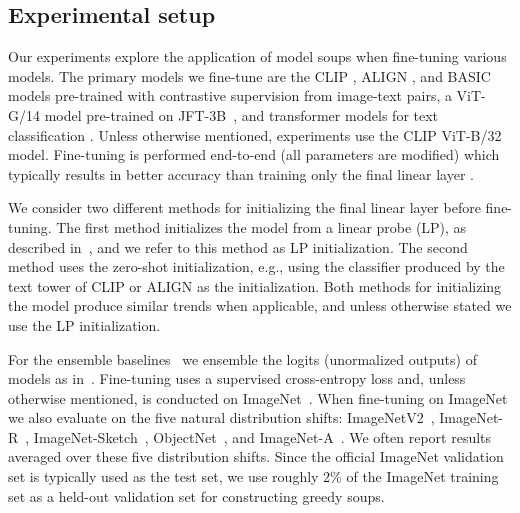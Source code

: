 \documentclass[nohyperref]{article}
\theoremstyle{plain}
\theoremstyle{definition}
\theoremstyle{remark}
\begin{document}
        \subsection{Experimental setup}\label{sec:setup}
        
        Our experiments explore the application of model soups when fine-tuning various models.
        The primary models we fine-tune are
        the CLIP \cite{radford2021learning}, ALIGN \cite{jia2021scaling}, and BASIC~\cite{pham2021scaling} 
        models pre-trained with contrastive supervision from image-text pairs,
        a ViT-G/14 model pre-trained on JFT-3B~\cite{zhai2021scaling},
        and transformer models for text classification \cite{devlin-etal-2019-bert,colin2020exploring}.
        Unless otherwise mentioned, experiments use the CLIP ViT-B/32 model.
        Fine-tuning is performed end-to-end (all parameters are modified)
        which typically results
        in better accuracy than training only the final linear layer \cite{kornblith2019better,agrawal2014analyzing,chatfield2014return,azizpour2015generic}.
        
        We consider two different methods for initializing the final linear layer before fine-tuning.
        The first method initializes the model from a linear probe (LP), as described in~\citet{kumar2021finetuning},
        and we refer to this method as LP initialization.
        The second method uses the zero-shot initialization, e.g., using the classifier produced by the text tower of CLIP or ALIGN as the initialization.
        Both methods for initializing the model produce similar trends when applicable, and unless otherwise
        stated we use the LP initialization.
        
    
        For the ensemble baselines~\cite{dietterich2000ensemble,deepensembles} we ensemble the logits (unormalized outputs)
        of models as in~\citet{gontijo2021no}.
        Fine-tuning uses a supervised cross-entropy loss and, unless otherwise mentioned, 
        is conducted on ImageNet~\cite{deng2009imagenet}.
        When fine-tuning on ImageNet we also evaluate on the five natural distribution shifts:
        ImageNetV2~\cite{pmlr-v97-recht19a}, ImageNet-R~\cite{imagenetr}, ImageNet-Sketch~\cite{imagenetsketch},
        ObjectNet~\cite{objectnet}, and ImageNet-A~\cite{imageneta}.
        We often report results averaged over these five distribution shifts.
        Since the official ImageNet validation set is typically used as the test set,
        we use roughly 2\% of the ImageNet training set as a held-out validation
        set for constructing greedy soups.
        
\end{document}

